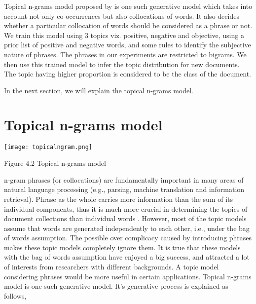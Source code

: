Topical n-grams model proposed by \citep*{wang2007topical} is one such generative model which takes into account not only co-occurrences but also collocations of words. It
also decides whether a particular collocation of words should be considered as a phrase or not. We train this model using 3 topics viz. positive, negative and objective, 
using a prior list of positive and negative words, and some rules to identify the subjective nature of phrases. The phrases in our experiments are restricted to bigrams. We
then use this trained model to infer the topic distribution for new documents. The topic having higher proportion is considered to be the class of the document.

In the next section, we will explain the topical n-grams model.

\section{Topical n-grams model}


\texttt{[image: topicalngram.png]} 
\begin{center}
 Figure 4.2 Topical n-grams model
\end{center}

n-gram phrases (or collocations) are fundamentally important in many areas of natural language processing (e.g., parsing, machine translation and information retrieval). 
Phrase as the whole carries more information than the sum of its individual components, thus it is much more crucial in determining the topics of document collections than
individual words \citep*{wang2005note}. However, most of the topic models assume that words are generated independently to each other, i.e., under the bag of words assumption.
The possible over complicacy caused by introducing phrases makes these topic models completely ignore them. It is true that these models with the bag of words assumption have
enjoyed a big success, and attracted a lot of interests from researchers with different backgrounds. A topic model considering phrases would be more useful in certain 
applications. Topical n-grams model is one such generative model. It's generative process is explained as follows,

